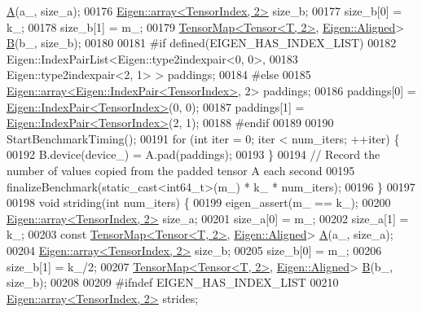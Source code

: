 \begin{DoxyCode}
      \hyperlink{group___core___module_class_eigen_1_1_matrix}{A}(a\_, size\_a);
00176     \hyperlink{class_eigen_1_1array}{Eigen::array<TensorIndex, 2>} size\_b;
00177     size\_b[0] = k\_;
00178     size\_b[1] = m\_;
00179     \hyperlink{class_eigen_1_1_tensor_map}{TensorMap<Tensor<T, 2>}, \hyperlink{group__enums_gga45fe06e29902b7a2773de05ba27b47a1ad37d4c71425bb286e9b4103830538fbf}{Eigen::Aligned}> 
      \hyperlink{group___core___module_class_eigen_1_1_matrix}{B}(b\_, size\_b);
00180 
00181 \textcolor{preprocessor}{#if defined(EIGEN\_HAS\_INDEX\_LIST)}
00182     Eigen::IndexPairList<Eigen::type2indexpair<0, 0>,
00183                          Eigen::type2indexpair<2, 1> > paddings;
00184 \textcolor{preprocessor}{#else}
00185     \hyperlink{class_eigen_1_1array}{Eigen::array<Eigen::IndexPair<TensorIndex>}, 2> paddings;
00186     paddings[0] = \hyperlink{struct_eigen_1_1_index_pair}{Eigen::IndexPair<TensorIndex>}(0, 0);
00187     paddings[1] = \hyperlink{struct_eigen_1_1_index_pair}{Eigen::IndexPair<TensorIndex>}(2, 1);
00188 \textcolor{preprocessor}{#endif}
00189 
00190     StartBenchmarkTiming();
00191     \textcolor{keywordflow}{for} (\textcolor{keywordtype}{int} iter = 0; iter < num\_iters; ++iter) \{
00192       B.device(device\_) = A.pad(paddings);
00193     \}
00194     \textcolor{comment}{// Record the number of values copied from the padded tensor A each second}
00195     finalizeBenchmark(static\_cast<int64\_t>(m\_) * k\_ * num\_iters);
00196   \}
00197 
00198  \textcolor{keywordtype}{void} striding(\textcolor{keywordtype}{int} num\_iters) \{
00199     eigen\_assert(m\_ == k\_);
00200     \hyperlink{class_eigen_1_1array}{Eigen::array<TensorIndex, 2>} size\_a;
00201     size\_a[0] = m\_;
00202     size\_a[1] = k\_;
00203     \textcolor{keyword}{const} \hyperlink{class_eigen_1_1_tensor_map}{TensorMap<Tensor<T, 2>}, \hyperlink{group__enums_gga45fe06e29902b7a2773de05ba27b47a1ad37d4c71425bb286e9b4103830538fbf}{Eigen::Aligned}> 
      \hyperlink{group___core___module_class_eigen_1_1_matrix}{A}(a\_, size\_a);
00204     \hyperlink{class_eigen_1_1array}{Eigen::array<TensorIndex, 2>} size\_b;
00205     size\_b[0] = m\_;
00206     size\_b[1] = k\_/2;
00207     \hyperlink{class_eigen_1_1_tensor_map}{TensorMap<Tensor<T, 2>}, \hyperlink{group__enums_gga45fe06e29902b7a2773de05ba27b47a1ad37d4c71425bb286e9b4103830538fbf}{Eigen::Aligned}> 
      \hyperlink{group___core___module_class_eigen_1_1_matrix}{B}(b\_, size\_b);
00208 
00209 \textcolor{preprocessor}{#ifndef EIGEN\_HAS\_INDEX\_LIST}
00210     \hyperlink{class_eigen_1_1array}{Eigen::array<TensorIndex, 2>} strides;

\end{DoxyCode}
